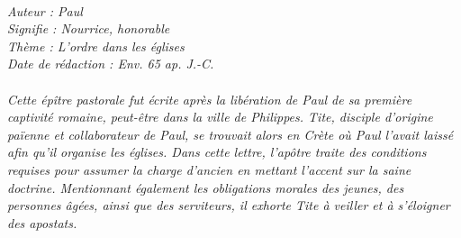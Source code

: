 \BFont
\noindent\hrulefill
{\footnotesize
\textit{
\bigskip
{\centering{}
\\Auteur : Paul
\\Signifie : Nourrice, honorable
\\Thème : L'ordre dans les églises
\\Date de rédaction : Env. 65 ap. J.-C.\\}
}
\textit{
\\Cette épître pastorale fut écrite après la libération de Paul de sa première captivité romaine, peut-être dans la ville de Philippes. Tite, disciple d’origine païenne et collaborateur de Paul, se trouvait alors en Crète où Paul l’avait laissé afin qu’il organise les églises. Dans cette lettre, l’apôtre traite des conditions requises pour assumer la charge d’ancien en mettant l’accent sur la saine doctrine. Mentionnant également les obligations morales des jeunes, des personnes âgées, ainsi que des serviteurs, il exhorte Tite à veiller et à s’éloigner des apostats.\bigskip
}
}
\par\nobreak\noindent\hrulefill
